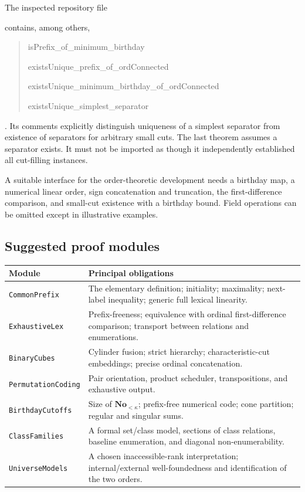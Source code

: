 \documentclass[11pt]{article}
\theoremstyle{definition}
\theoremstyle{remark}
\newcommand{\No}{\mathbf{No}}
\begin{document}
The inspected repository file
\begin{quote}\small
{}
\end{quote}
contains, among others,
\begin{quote}\small\ttfamily
isPrefix\_of\_minimum\_birthday\par
existsUnique\_prefix\_of\_ordConnected\par
existsUnique\_minimum\_birthday\_of\_ordConnected\par
existsUnique\_simplest\_separator
\end{quote}
\cite{ProveItSimplicity}. Its comments explicitly distinguish uniqueness of a
simplest separator from existence of separators for arbitrary small cuts.
The last theorem assumes a separator exists. It must not be imported as
though it independently established all cut-filling instances.

A suitable interface for the order-theoretic development needs a birthday
map, a numerical linear order, sign concatenation and truncation, the
first-difference comparison, and small-cut existence with a birthday
bound. Field operations can be omitted except in illustrative examples.

\subsection{Suggested proof modules}

\begin{longtable}{@{}p{}p{}@{}}
\toprule
Module & Principal obligations\\
\midrule
\endhead
\texttt{CommonPrefix} & The elementary definition; initiality; maximality;
next-label inequality; generic full lexical linearity.\\
\texttt{ExhaustiveLex} & Prefix-freeness; equivalence with ordinal
first-difference comparison; transport between relations and enumerations.\\
\texttt{BinaryCubes} & Cylinder fusion; strict hierarchy;
characteristic-cut embeddings; precise ordinal concatenation.\\
\texttt{PermutationCoding} & Pair orientation, product scheduler,
transpositions, and exhaustive output.\\
\texttt{BirthdayCutoffs} & Size of $\No_{<\kappa}$; prefix-free numerical code;
cone partition; regular and singular sums.\\
\texttt{ClassFamilies} & A formal set/class model, sections of class
relations, baseline enumeration, and diagonal non-enumerability.\\
\texttt{UniverseModels} & A chosen inaccessible-rank interpretation;
internal/external well-foundedness and identification of the two orders.\\
\bottomrule
\end{longtable}
\end{document}
